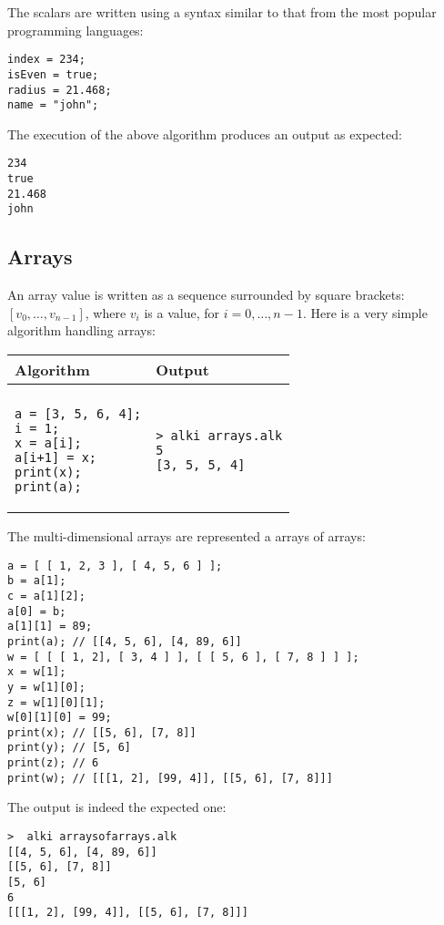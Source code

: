\documentclass[a4paper]{report}
\begin{document}
The scalars are written using a syntax similar to that from the most popular programming languages: 
\begin{verbatim}
index = 234;
isEven = true;
radius = 21.468;
name = "john";
\end{verbatim}
The execution of the above algorithm produces an output as expected:
\begin{verbatim}
234
true
21.468
john
\end{verbatim}


\subsection{Arrays}

An array value is written as a sequence surrounded by square brackets: $[v_0,\ldots,v_{n-1}]$, where $v_i$ is a value, for $i=0,\ldots,n-1$.
Here is a very simple algorithm handling arrays:
\begin{center}
\begin{tabular}{ll}
Algorithm & Output\\
\hline
\\
\begin{minipage}{.35\textwidth}
\begin{verbatim}
a = [3, 5, 6, 4];
i = 1;
x = a[i];
a[i+1] = x;
print(x);
print(a);
\end{verbatim}
\end{minipage}
&
\begin{minipage}{.3\textwidth}
\begin{verbatim}
> alki arrays.alk
5
[3, 5, 5, 4]
\end{verbatim}
\end{minipage}
\end{tabular}
\end{center}
The multi-dimensional arrays are represented a arrays of arrays:
\begin{verbatim}
a = [ [ 1, 2, 3 ], [ 4, 5, 6 ] ]; 
b = a[1];
c = a[1][2];
a[0] = b;
a[1][1] = 89;
print(a); // [[4, 5, 6], [4, 89, 6]]
w = [ [ [ 1, 2], [ 3, 4 ] ], [ [ 5, 6 ], [ 7, 8 ] ] ];
x = w[1];
y = w[1][0];
z = w[1][0][1];
w[0][1][0] = 99;
print(x); // [[5, 6], [7, 8]]
print(y); // [5, 6]
print(z); // 6
print(w); // [[[1, 2], [99, 4]], [[5, 6], [7, 8]]]
\end{verbatim}
The output is indeed the expected one:
\begin{verbatim}
>  alki arraysofarrays.alk
[[4, 5, 6], [4, 89, 6]]
[[5, 6], [7, 8]]
[5, 6]
6
[[[1, 2], [99, 4]], [[5, 6], [7, 8]]]
\end{verbatim}
\end{document}
